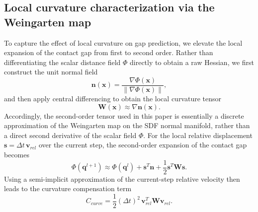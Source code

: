 \subsection{Local curvature characterization via the Weingarten map}
To capture the effect of local curvature on gap prediction, we elevate the local expansion of the contact gap from first to second order. Rather than differentiating the scalar distance field $\Phi$ directly to obtain a raw Hessian, we first construct the unit normal field
\begin{equation}
    \mathbf{n}(\mathbf{x}) = \frac{\nabla \Phi(\mathbf{x})}{\|\nabla \Phi(\mathbf{x})\|},
\end{equation}
and then apply central differencing to obtain the local curvature tensor
\begin{equation}
    \mathbf{W}(\mathbf{x}) \approx \nabla \mathbf{n}(\mathbf{x}).
\end{equation}
Accordingly, the second-order tensor used in this paper is essentially a discrete approximation of the Weingarten map on the SDF normal manifold, rather than a direct second derivative of the scalar field $\Phi$. For the local relative displacement $\mathbf{s} = \Delta t \, \mathbf{v}_{rel}$ over the current step, the second-order expansion of the contact gap becomes
\begin{equation}
    \Phi(\mathbf{q}^{l+1}) \approx \Phi(\mathbf{q}^{l}) + \mathbf{s}^T \mathbf{n} + \frac{1}{2}\mathbf{s}^T \mathbf{W}\mathbf{s}.
\end{equation}
Using a semi-implicit approximation of the current-step relative velocity then leads to the curvature compensation term
\begin{equation}
    C_{curve} = \frac{1}{2} (\Delta t)^2 \, \mathbf{v}_{rel}^T \mathbf{W} \mathbf{v}_{rel}.
\end{equation}

